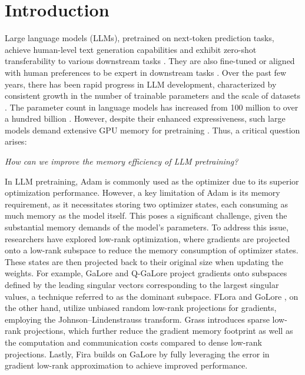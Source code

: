 \section{Introduction}


Large language models (LLMs), pretrained on next-token prediction tasks, achieve human-level text generation capabilities and exhibit zero-shot transferability to various downstream tasks \cite{brown2020language}. They are also fine-tuned or aligned with human preferences to be expert in downstream tasks \cite{touvron2023llama, ouyang2022training}. Over the past few years, there has been rapid progress in LLM development, characterized by consistent growth in the number of trainable parameters and the scale of datasets \cite{gpt4, mistral, llama3, phi3}. The parameter count in language models has increased from 100 million \cite{radford2018improving} to over a hundred billion \cite{chowdhery2023palm}. However, despite their enhanced expressiveness, such large models demand extensive GPU memory for pretraining \cite{narayanan2021efficient}.
Thus, a critical question arises:
\begin{center} {\it How can we improve the memory efficiency of LLM pretraining? } \end{center}



In LLM pretraining, Adam is commonly used as the optimizer due to its superior optimization performance. However, a key limitation of Adam is its memory requirement, as it necessitates storing two optimizer states, each consuming as much memory as the model itself. This poses a significant challenge, given the substantial memory demands of the model's parameters.
To address this issue, researchers have explored low-rank optimization, where gradients are projected onto a low-rank subspace to reduce the memory consumption of optimizer states. These states are then projected back to their original size when updating the weights. For example, GaLore \cite{zhao2024galore} and Q-GaLore \cite{zhang2024q-galore} project gradients onto subspaces defined by the leading singular vectors corresponding to the largest singular values, a technique referred to as the dominant subspace. FLora \cite{hao2024flora} and GoLore \cite{he2024subspace}, on the other hand, utilize unbiased random low-rank projections for gradients, employing the Johnson–Lindenstrauss transform. Grass \cite{muhamed2024grass} introduces sparse low-rank projections, which further reduce the gradient memory footprint as well as the computation and communication costs compared to dense low-rank projections. Lastly, Fira \cite{chen2024fira} builds on GaLore by fully leveraging the error in gradient low-rank approximation to achieve improved performance.


